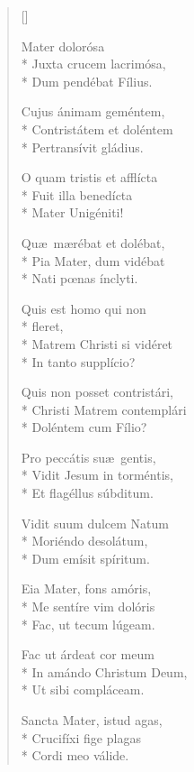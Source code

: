 \newHymn
{}

\begin{multicols}{2}
\begin{verse}[\versewidth]
\raggedright
{} Mater dolorósa\\*
Juxta crucem lacrimósa,\\*
Dum pendébat Fílius.
\pointtrans

Cujus ánimam geméntem,\\*
Contristátem et doléntem\\*
Pertransívit gládius.

O quam tristis et afflícta\\*
Fuit illa benedícta\\*
Mater Unigéniti!

Qu\ae\ m\ae rébat et dolébat,\\*
Pia Mater, dum vidébat\\*
Nati p\oe nas ínclyti.

Quis est homo qui non\\*
\qquad fleret,\\*
Matrem Christi si vidéret\\*
In tanto supplício?

Quis non posset contristári,\\*
Christi Matrem contemplári\\*
Doléntem cum Fílio?

Pro peccátis su\ae\ gentis,\\*
Vidit Jesum in torméntis,\\*
Et flagéllus súbditum.

Vidit suum dulcem Natum\\*
Moriéndo desolátum,\\*
Dum emísit spíritum.

Eia Mater, fons amóris,\\*
Me sentíre vim dolóris\\*
Fac, ut tecum lúgeam.

Fac ut árdeat cor meum\\*
In amándo Christum Deum,\\*
Ut sibi compláceam.

Sancta Mater, istud agas,\\*
Crucifíxi fige plagas\\*
Cordi meo válide.


\end{verse}
\end{multicols}
